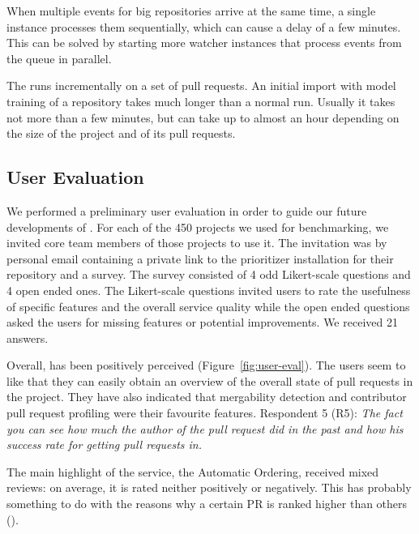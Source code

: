 \documentclass[conference]{IEEEtran}
\begin{document}
When multiple events for big repositories arrive at the same time, a single
\prioritizer instance processes them sequentially, which can cause a delay of a
few minutes. This can be solved by starting more watcher instances that
process events from the queue in parallel.

The \prioritizer runs incrementally on a set of pull requests. An initial import
with model training of a repository takes much longer than a normal run. Usually
it takes not more than a few minutes, but can take up to almost an hour
depending on the size of the project and of its pull requests.

\subsection{User Evaluation}

We performed a preliminary user evaluation in order to guide our future
developments of \prioritizer . For each of the 450 projects we used for
benchmarking, we invited core team members of those projects to use it.  The
invitation was by personal email containing a private link to the prioritizer
installation for their repository and a survey. The survey consisted of 4 odd
Likert-scale questions and 4 open ended ones. The Likert-scale questions invited
users to rate the usefulness of specific features and the overall service
quality while the open ended questions asked the users for missing features or
potential improvements. We received 21 answers.

Overall, \prioritizer has been positively perceived (Figure~\ref{fig:user-eval}). 
The users seem to like that they can easily obtain an overview of the overall 
state of pull requests in the project. They have also indicated that mergability 
detection and contributor pull request profiling were their favourite features. 
Respondent 5 (R5): \emph{The fact you can see how much the author of the 
pull request did in the past and how his success rate for getting pull requests in.}

The main highlight of the service, the Automatic Ordering, received mixed
reviews: on average, it is rated neither positively or negatively. This has probably
something to do with the reasons why a certain PR is ranked higher than others ().
\end{document}
